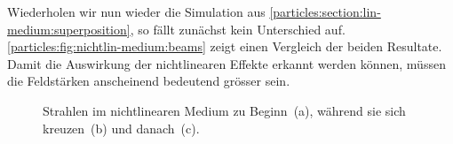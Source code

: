Wiederholen wir nun wieder die Simulation aus \autoref{particles:section:lin-medium:superposition}, so fällt zunächst kein Unterschied auf.
\autoref{particles:fig:nichtlin-medium:beams} zeigt einen Vergleich der beiden Resultate.
Damit die Auswirkung der nichtlinearen Effekte erkannt werden können, müssen die Feldstärken anscheinend bedeutend grösser sein.
\begin{figure}
    \centering
    \label{particles:fig:nichtlin-medium:beams-1}\hfill
    \label{particles:fig:nichtlin-medium:beams-2}\hfill
    \label{particles:fig:nichtlin-medium:beams-3}
    \caption{Strahlen im nichtlinearen Medium zu Beginn~(a), während sie sich kreuzen~(b) und danach~(c).}\label{particles:fig:nichtlin-medium:beams}
\end{figure}


